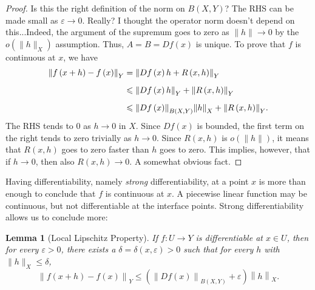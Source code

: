 \documentclass[letterpaper,twoside,12pt]{article}
\theoremstyle{mystyle}
\newtheorem{lemma}[theorem]{Lemma}
\newcommand{\cg}{\color{gray}}
\newcommand{\cbk}{\color{black}}
\newcommand{\cred}{\color{red}}
\newcommand{\ve}{\varepsilon}
\begin{document}
\begin{proof}
    \cred Is this the right definition of the norm on $B(X,Y)$? \cbk The RHS can be made small as $\ve \to 0$. \cred Really? I thought the operator norm doesn't depend on this...\cbk Indeed, the argument of the supremum goes to zero as $\|h\| \to 0$ by the $o(\|h\|_X)$ assumption. Thus, $A = B = Df(x)$ is unique. 
    To prove that $f$ is continuous at $x$, we have 
    \begin{equation}
      \begin{split}
          {\left\| {f\left( {x + h} \right) - f\left( x \right)} \right\|_Y}& = {\left\| {Df\left( x \right)h + R\left( {x,h} \right)} \right\|_Y} \hfill \\[.2cm]
           &\leqslant {\left\| {Df\left( x \right)h} \right\|_Y} + {\left\| {R\left( {x,h} \right)} \right\|_Y} \hfill \\[.2cm]
           &\leqslant {\left\| {Df\left( x \right)} \right\|_{B\left( {X,Y} \right)}}{\left\| h \right\|_X} + {\left\| {R\left( {x,h} \right)} \right\|_Y}.
      \end{split}
    \end{equation}
    The RHS tends to $0$ as $h \to 0$ in $X$. \cg Since $Df(x)$ is bounded, the first term on the right tends to zero trivially as $h \to 0$. Since $R(x,h)$ is $o(\|h\|)$, it means that $R(x,h)$ goes to zero faster than $h$ goes to zero. This implies, however, that if $h\to 0$, then also $R(x, h) \to 0$. A somewhat obvious fact. \cbk 
  \end{proof}
  Having differentiability, namely \textit{strong} differentiability, at a point $x$ is more than enough to conclude that $f$ is continuous at $x$. A piecewise linear function may be continuous, but not differentiable at the interface points. Strong differentiability allows us to conclude more: 
  \begin{tcolorbox}[colback=red!5!white,colframe=red!75!black]
    \begin{lemma}[Local Lipschitz Property]
      If $f:U \to Y$ is differentiable at $x \in U$, then for every $\ve > 0$, there exists a $\delta = \delta(x, \ve) > 0$ such that for every $h$ with $\|h\|_X \leq \delta$, 
      \[{\left\| {f\left( {x + h} \right) - f\left( x \right)} \right\|_Y} \leqslant \left( {{{\left\| {Df\left( x \right)} \right\|}_{B\left( {X,Y} \right)}} + \varepsilon } \right){\left\| h \right\|_X}.\]
    \end{lemma} 
  \end{tcolorbox}
\end{document}
